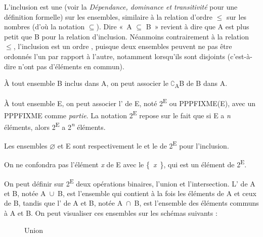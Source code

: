 {    L’inclusion est une  (voir la  \textit{Dépendance, dominance et transitivité} pour une définition formelle) sur les ensembles, similaire à la relation d’ordre ${\leq}$ sur les nombres (d’où la notation \textrm{${\subseteq}$}). Dire «~A \textrm{${\subseteq}$} B~» revient à dire que A est plus petit que B pour la relation d’inclusion. Néanmoins contrairement à la relation ${\leq}$, l’inclusion est un ordre , puisque deux ensembles peuvent ne pas être ordonnés l’un par rapport à l’autre, notamment lorsqu’ils sont disjoints (c’est-à-dire n’ont pas d’éléments en commun).

    À tout ensemble B inclus dans A, on peut associer le  \textrm{${\complement}$}\textsubscript{A}B de B dans A.

    À tout ensemble E, on peut associer l’ de E, noté 2\textsuperscript{E} ou \textrm{PPPFIXME}(E), avec un \textrm{PPPFIXME} comme \textit{partie}. La notation 2\textsuperscript{E} repose sur le fait que si E a \textit{n} éléments, alors 2\textsuperscript{E} a 2\textit{\textsuperscript{n}} éléments.

    Les ensembles \textrm{${\varnothing}$} et E sont respectivement le  et le  de 2\textsuperscript{E} pour l’inclusion.

    On ne confondra pas l’élément \textit{x} de E avec le  \{~\textit{x}~\}, qui est un élément de 2\textsuperscript{E}.

    On peut définir sur 2\textsuperscript{E} deux opérations binaires, l’union et l’intersection. L’ de A et B, notée A~\textrm{${\cup}$}~B, est l’ensemble qui contient à la fois les éléments de A et ceux de B, tandis que l’ de A et B, notée A~\textrm{${\cap}$}~B, est l’ensemble des éléments communs à A et B. On peut visualiser ces ensembles sur les schémas suivants :

    \begin{figure}
    \caption{Union}                                                                   
    \end{figure}
    
}
